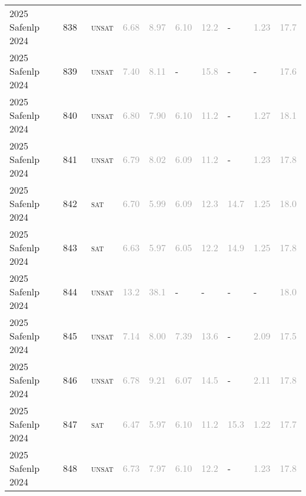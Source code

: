 \begin{center}
{\begin{longtable}{@{}llllllllll@{}}
2025 Safenlp 2024 & 838 & ~\textsc{unsat} & \textcolor{darkgray}{6.68} & \textcolor{darkgray}{8.97} & \textcolor{darkgray}{6.10} & \textcolor{darkgray}{12.2} & - & \textcolor{darkgray}{1.23} & \textcolor{darkgray}{17.7} \\
2025 Safenlp 2024 & 839 & ~\textsc{unsat} & \textcolor{darkgray}{7.40} & \textcolor{darkgray}{8.11} & - & \textcolor{darkgray}{15.8} & - & - & \textcolor{darkgray}{17.6} \\
2025 Safenlp 2024 & 840 & ~\textsc{unsat} & \textcolor{darkgray}{6.80} & \textcolor{darkgray}{7.90} & \textcolor{darkgray}{6.10} & \textcolor{darkgray}{11.2} & - & \textcolor{darkgray}{1.27} & \textcolor{darkgray}{18.1} \\
2025 Safenlp 2024 & 841 & ~\textsc{unsat} & \textcolor{darkgray}{6.79} & \textcolor{darkgray}{8.02} & \textcolor{darkgray}{6.09} & \textcolor{darkgray}{11.2} & - & \textcolor{darkgray}{1.23} & \textcolor{darkgray}{17.8} \\
2025 Safenlp 2024 & 842 & ~\textsc{sat} & \textcolor{darkgray}{6.70} & \textcolor{darkgray}{5.99} & \textcolor{darkgray}{6.09} & \textcolor{darkgray}{12.3} & \textcolor{darkgray}{14.7} & \textcolor{darkgray}{1.25} & \textcolor{darkgray}{18.0} \\
2025 Safenlp 2024 & 843 & ~\textsc{sat} & \textcolor{darkgray}{6.63} & \textcolor{darkgray}{5.97} & \textcolor{darkgray}{6.05} & \textcolor{darkgray}{12.2} & \textcolor{darkgray}{14.9} & \textcolor{darkgray}{1.25} & \textcolor{darkgray}{17.8} \\
2025 Safenlp 2024 & 844 & ~\textsc{unsat} & \textcolor{darkgray}{13.2} & \textcolor{darkgray}{38.1} & - & - & - & - & \textcolor{darkgray}{18.0} \\
2025 Safenlp 2024 & 845 & ~\textsc{unsat} & \textcolor{darkgray}{7.14} & \textcolor{darkgray}{8.00} & \textcolor{darkgray}{7.39} & \textcolor{darkgray}{13.6} & - & \textcolor{darkgray}{2.09} & \textcolor{darkgray}{17.5} \\
2025 Safenlp 2024 & 846 & ~\textsc{unsat} & \textcolor{darkgray}{6.78} & \textcolor{darkgray}{9.21} & \textcolor{darkgray}{6.07} & \textcolor{darkgray}{14.5} & - & \textcolor{darkgray}{2.11} & \textcolor{darkgray}{17.8} \\
2025 Safenlp 2024 & 847 & ~\textsc{sat} & \textcolor{darkgray}{6.47} & \textcolor{darkgray}{5.97} & \textcolor{darkgray}{6.10} & \textcolor{darkgray}{11.2} & \textcolor{darkgray}{15.3} & \textcolor{darkgray}{1.22} & \textcolor{darkgray}{17.7} \\
2025 Safenlp 2024 & 848 & ~\textsc{unsat} & \textcolor{darkgray}{6.73} & \textcolor{darkgray}{7.97} & \textcolor{darkgray}{6.10} & \textcolor{darkgray}{12.2} & - & \textcolor{darkgray}{1.23} & \textcolor{darkgray}{17.8} \\

\end{longtable}}
\end{center}
